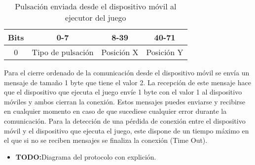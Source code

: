 \begin{table}[h!]
\centering
\begin{tabular}{|l|c|c|c|} 
\hline
Bits                    & 0-7               & 8-39                            & 40-71                            \\ 
\hline
\multicolumn{1}{|c|}{0} & Tipo de pulsaci\'on & \multicolumn{1}{l|}{Posici\'on X} & \multicolumn{1}{l|}{Posici\'on Y}  \\
\hline
\end{tabular}
\caption{Pulsaci\'on enviada desde el dispositivo m\'ovil al ejecutor del juego}
\label{table:2}
\end{table}

Para el cierre ordenado de la comunicaci\'on desde el dispositivo m\'ovil se env\'ia un mensaje de tama\~no 1 byte que tiene el valor 2. La recepci\'on de este mensaje hace que el dispositivo que ejecuta el juego env\'ie 1 byte con el valor 1 al dispositivo m\'oviles y ambos cierran la conexi\'on. Estos mensajes puedes enviarse y recibirse en cualquier momento en caso de que sucediese cualquier error durante la comunicaci\'on. Para la detecci\'on de una p\'erdida de conexi\'on entre el dispositivo m\'ovil y el dispositivo que ejecuta el juego, este dispone de un tiempo m\'aximo en el que si no se reciben mensajes se finaliza la conexi\'on (Time Out).

\begin {itemize}
\item \textbf{TODO:}Diagrama del protocolo con explici\'on.
\end {itemize}



